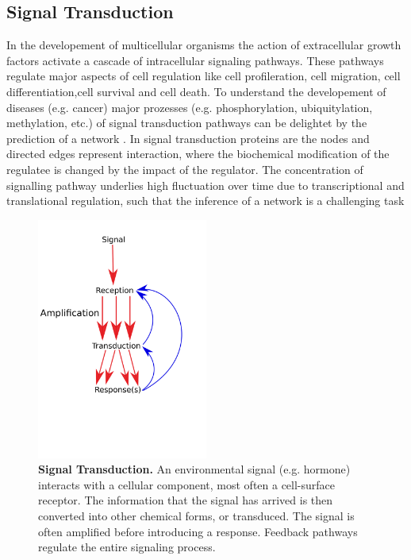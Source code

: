 \newpage

\subsection*{Signal Transduction}

In the developement of multicellular organisms the action of extracellular growth factors activate a cascade of intracellular signaling pathways. These pathways regulate major aspects of cell regulation like cell profileration, cell migration, cell differentiation,cell survival and cell death. To understand the developement of diseases (e.g. cancer) major prozesses (e.g. phosphorylation, ubiquitylation, methylation, etc.) of signal transduction pathways can be delightet by the prediction of a network . In signal transduction proteins are the nodes and directed edges represent interaction, where the biochemical modification of the regulatee is changed by the impact of the regulator. The concentration of signalling pathway underlies high fluctuation over time due to transcriptional and translational regulation, such that the inference of a network is a challenging task \citep{BIES:BIES20834}


\begin{figure}[H]
\centering
\includegraphics[width=0.5\textwidth]{./Bilder/signaltransduction.pdf}
\setlength{\abovecaptionskip}{-10ex}
\caption[Signal Transduction]{\textbf{Signal Transduction.} An environmental signal (e.g. hormone) interacts with a cellular component, most often a cell-surface receptor. The information that the signal has arrived is then converted into other chemical forms, or transduced. The signal is often amplified before introducing a response. Feedback pathways regulate the entire signaling process.\citep{Berg JM, Tymoczko JL, Stryer L. Biochemistry. 5th edition. New York: W H Freeman; 2002. Chapter 15, Signal-Transduction Pathways: An Introduction to Information Metabolism. Available from: https://www.ncbi.nlm.nih.gov/books/NBK21205/} }
\label{fig:Fig.1.}
\end{figure}


